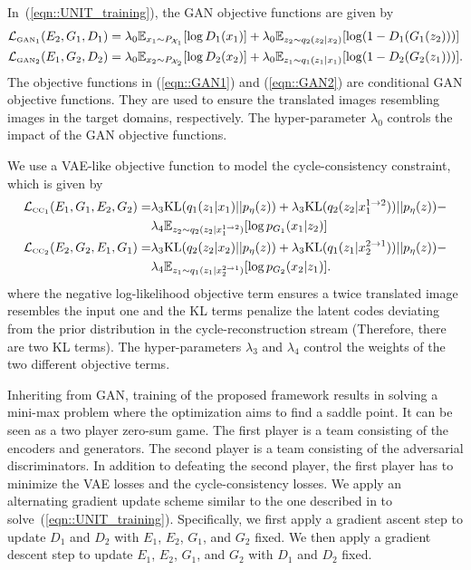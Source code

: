\documentclass{article}
\begin{document}
In~(\ref{eqn::UNIT_training}), the GAN objective functions are given by  
\begin{align}
\mathcal{L}_{\text{\tiny GAN}_1}&(E_2,G_1,D_1)=\lambda_0\mathbb{E}_{x_1 \sim P_{\mathcal{X}_1}} [\log D_1 (x_1) ]+\lambda_0\mathbb{E}_{z_2 \sim q_2 (z_2|x_2)}[\log(1-D_1(G_1(z_2)))]\label{eqn::GAN1}\\
\mathcal{L}_{\text{\tiny GAN}_2}&(E_1,G_2,D_2)=\lambda_0\mathbb{E}_{x_2 \sim P_{\mathcal{X}_2}} [\log D_2 (x_2) ]+\lambda_0\mathbb{E}_{z_1 \sim q_1 (z_1|x_1)}[\log(1-D_2(G_2(z_1)))].\label{eqn::GAN2}
\end{align}
The objective functions in (\ref{eqn::GAN1}) and (\ref{eqn::GAN2}) are conditional GAN objective functions. They are used to ensure the translated images resembling images in the target domains, respectively. The hyper-parameter $\lambda_0$ controls the impact of the GAN objective functions.

We use a VAE-like objective function to model the cycle-consistency constraint, which is given by
\begin{align}
\mathcal{L}_{\text{\tiny CC}_1}(E_1,G_1,E_2,G_2)=&\lambda_3\text{KL}( q_1(z_1|x_1) || p_{\eta}(z) )+\lambda_3\text{KL}( q_2(z_2|x_1^{1\rightarrow 2})) || p_{\eta}(z) )-\nonumber\\
&\lambda_4\mathbb{E}_{z_2 \sim q_2 (z_2|x_1^{1\rightarrow 2})}[\log p_{G_1}(x_1|z_2)]\label{eqn::cc1}\\
\mathcal{L}_{\text{\tiny CC}_2}(E_2,G_2,E_1,G_1)=&\lambda_3\text{KL}( q_2(z_2|x_2) || p_{\eta}(z) )+\lambda_3\text{KL}( q_1(z_1|x_2^{2\rightarrow 1})) || p_{\eta}(z) )-\nonumber\\
&\lambda_4\mathbb{E}_{z_1 \sim q_1 (z_1|x_2^{2\rightarrow 1})}[\log p_{G_2}(x_2|z_1)].\label{eqn::cc2}
\end{align}
where the negative log-likelihood objective term ensures a twice translated image resembles the input one and the KL terms penalize the latent codes deviating from the prior distribution in the cycle-reconstruction stream (Therefore, there are two KL terms). The hyper-parameters $\lambda_3$ and $\lambda_4$ control the weights of the two different objective terms.

Inheriting from GAN, training of the proposed framework results in solving a mini-max problem where the optimization aims to find a saddle point. It can be seen as a two player zero-sum game. The first player is a team consisting of the encoders and generators. The second player is a team consisting of the adversarial discriminators. In addition to defeating the second player, the first player has to minimize the VAE losses and the cycle-consistency losses. We apply an alternating gradient update scheme similar to the one described in \cite{goodfellow2014generative} to solve~(\ref{eqn::UNIT_training}). Specifically, we first apply a gradient ascent step to update $D_1$ and $D_2$ with $E_1$, $E_2$, $G_1$, and $G_2$ fixed. We then apply a gradient descent step to update $E_1$, $E_2$, $G_1$, and $G_2$ with $D_1$ and $D_2$ fixed. 
\end{document}
